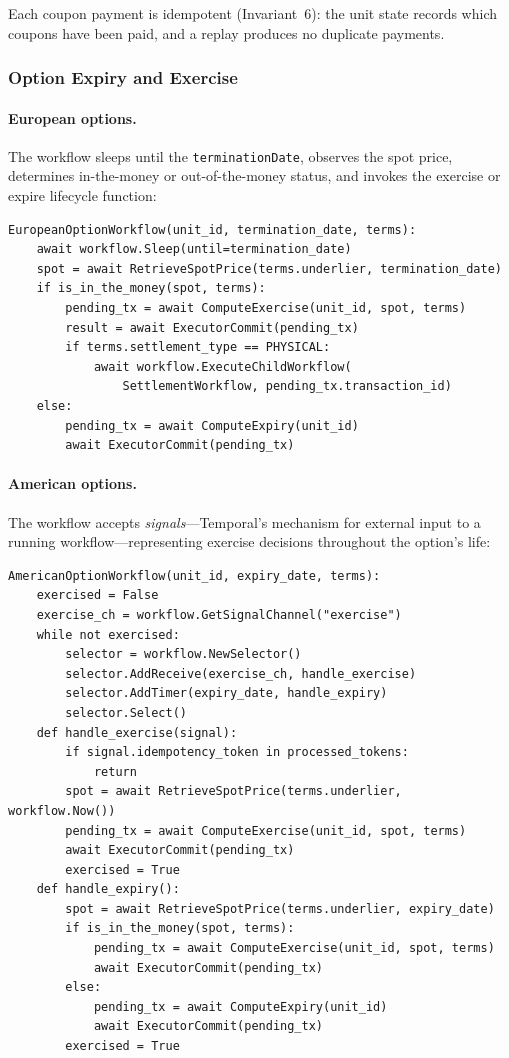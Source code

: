 \documentclass[11pt,a4paper]{article}
\begin{document}
\noindent Each coupon payment is idempotent (Invariant~6): the unit state records which coupons have been paid, and a replay produces no duplicate payments.

\subsubsection{Option Expiry and Exercise}

\paragraph{European options.} The workflow sleeps until the \texttt{terminationDate}, observes the spot price, determines in-the-money or out-of-the-money status, and invokes the exercise or expire lifecycle function:

\begin{lstlisting}
EuropeanOptionWorkflow(unit_id, termination_date, terms):
    await workflow.Sleep(until=termination_date)
    spot = await RetrieveSpotPrice(terms.underlier, termination_date)
    if is_in_the_money(spot, terms):
        pending_tx = await ComputeExercise(unit_id, spot, terms)
        result = await ExecutorCommit(pending_tx)
        if terms.settlement_type == PHYSICAL:
            await workflow.ExecuteChildWorkflow(
                SettlementWorkflow, pending_tx.transaction_id)
    else:
        pending_tx = await ComputeExpiry(unit_id)
        await ExecutorCommit(pending_tx)
\end{lstlisting}

\paragraph{American options.} The workflow accepts \emph{signals}---Temporal's mechanism for external input to a running workflow---representing exercise decisions throughout the option's life:

\begin{lstlisting}
AmericanOptionWorkflow(unit_id, expiry_date, terms):
    exercised = False
    exercise_ch = workflow.GetSignalChannel("exercise")
    while not exercised:
        selector = workflow.NewSelector()
        selector.AddReceive(exercise_ch, handle_exercise)
        selector.AddTimer(expiry_date, handle_expiry)
        selector.Select()
    def handle_exercise(signal):
        if signal.idempotency_token in processed_tokens:
            return
        spot = await RetrieveSpotPrice(terms.underlier, workflow.Now())
        pending_tx = await ComputeExercise(unit_id, spot, terms)
        await ExecutorCommit(pending_tx)
        exercised = True
    def handle_expiry():
        spot = await RetrieveSpotPrice(terms.underlier, expiry_date)
        if is_in_the_money(spot, terms):
            pending_tx = await ComputeExercise(unit_id, spot, terms)
            await ExecutorCommit(pending_tx)
        else:
            pending_tx = await ComputeExpiry(unit_id)
            await ExecutorCommit(pending_tx)
        exercised = True
\end{lstlisting}
\end{document}
